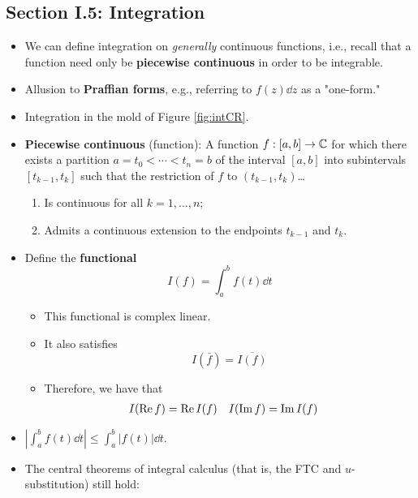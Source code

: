 \documentclass[../notes.tex]{subfiles}
\begin{document}
\subsection*{Section I.5: Integration}
\begin{itemize}
    \item {}We can define integration on \emph{generally} continuous functions, i.e., recall that a function need only be \textbf{piecewise continuous} in order to be integrable.
    \item Allusion to \textbf{Praffian forms}, e.g., referring to $f(z)\dd{z}$ as a "one-form."
    \item Integration in the mold of Figure \ref{fig:intCR}.
    \item \textbf{Piecewise continuous} (function): A function $f:[a,b]\to\mathbb{C}$ for which there exists a partition $a=t_0<\cdots<t_n=b$ of the interval $[a,b]$ into subintervals $[t_{k-1},t_k]$ such that the restriction of $f$ to $(t_{k-1},t_k)$\dots
    \begin{enumerate}
        \item Is continuous for all $k=1,\dots,n$;
        \item Admits a continuous extension to the endpoints $t_{k-1}$ and $t_k$.
    \end{enumerate}
    \item Define the \textbf{functional}
    \begin{equation*}
        I(f) = \int_a^bf(t)\dd{t}
    \end{equation*}
    \begin{itemize}
        \item This functional is complex linear.
        \item It also satisfies
        \begin{equation*}
            I(\bar{f}) = \overline{I(f)}
        \end{equation*}
        \item Therefore, we have that
        \begin{align*}
            I(\operatorname{Re} f) &= \operatorname{Re} I(f)&
            I(\operatorname{Im} f) &= \operatorname{Im} I(f)
        \end{align*}
    \end{itemize}
    \item $|\int_a^bf(t)\dd{t}|\leq\int_a^b|f(t)|\dd{t}$.
    \item The central theorems of integral calculus (that is, the FTC and $u$-substitution) still hold:
    \begin{itemize}

\end{itemize}
\end{itemize}
\end{document}
